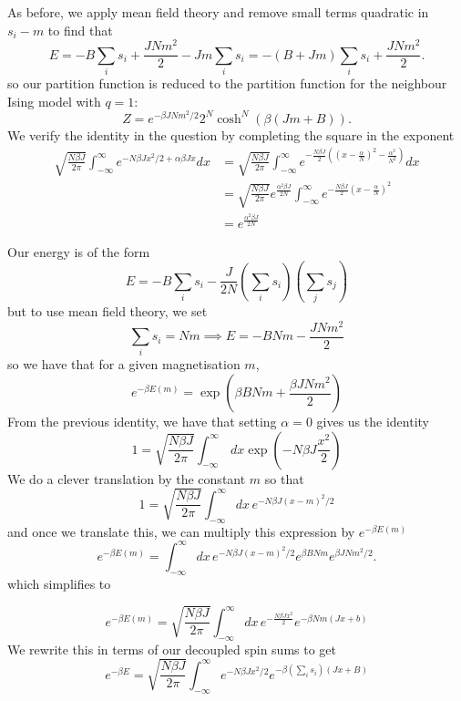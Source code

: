 \documentclass[11pt, oneside]{article}   	%
\begin{document}
As before, we apply mean field theory and remove small terms quadratic in $s_i - m$ to find that 
\[ 
	E = - B \sum_i s_i +  \frac{JNm^2}{2} - J m \sum_i s_i  = - (B + Jm ) \sum_i s_i + \frac{JNm^2}{2}. 
\] 
so our partition function is reduced to the partition function for the neighbour Ising model with $q = 1$: 
\[
	Z =  e^{ - \beta J N m^2 / 2}2^N \cosh^N(\beta(J m + B)). 
\]
We verify the identity in the question by completing the square in the exponent 
\begin{align*}
	\sqrt{\frac{N \beta J }{2 \pi}} \int_{ -\infty}^{\infty} e^{ - N \beta J x^2 / 2 + \alpha \beta J x } dx&= \sqrt{\frac{N \beta J }{2 \pi}} \int_{- \infty}^{\infty} e^{ - \frac{N \beta J }{2} ((x - \frac{\alpha}{N})^2 - \frac{\alpha^2}{N^2})}dx \\ 
		&= \sqrt{\frac{N \beta J }{2 \pi}} e^{\frac{\alpha^2 \beta J }{2 N }} \int_{ - \infty}^{\infty} e^{ -\frac{N \beta J }{2} (x - \frac{\alpha}{N})^2} \\
		&= e^{\frac{\alpha^2 \beta J }{2 N }}
\end{align*}



Our energy is of the form 
\[
	E = - B\sum_i s_i - \frac{J}{2N}\left( \sum_i s_i \right) \left( \sum_j s_j \right)  
\]
but to use mean field theory, we set 
\[
	\sum_i s_i = Nm \implies E = - BNm - \frac{JNm^2}{2} 
\]
so we have that for a given magnetisation $m$, 
\[
	e^{ - \beta E(m) } = \exp(\beta B Nm + \frac{\beta JNm^2}{2}) 
\]
From the previous identity, we have that setting $\alpha = 0$ gives us the identity 
\[
	1 = \sqrt{\frac{N \beta J}{2 \pi}} \int_{ - \infty}^{\infty} \, dx \exp( - N \beta J \frac{x^2}{2}) 
\]
We do a clever translation by the constant $m$ so that 
\[
	1 = \sqrt{\frac{N\beta J}{2 \pi}} \int_{-\infty}^\infty dx \, e^{ - N \beta J (x - m)^2 / 2}
\]
and once we translate this, we can multiply this expression by $e^{ - \beta E(m)}$
\[
	e^{ - \beta E(m)} = \int_{ - \infty}^\infty dx \, e^{ - N \beta J (x - m)^2  / 2}e^{\beta B N m}e^{\beta J N m^2 / 2}.
\]
which simplifies to 


\[
e^{ - \beta E(m)} = \sqrt{\frac{N \beta J}{2 \pi}} \int_{ - \infty}^{\infty} dx \, e^{ - \frac{N \beta J x^2}{2}}e^{ - \beta Nm(J x + b)}  
\]
We rewrite this in terms of our decoupled spin sums to get 
\[
e^{ - \beta E} = \sqrt{\frac{N \beta J }{2 \pi}} \int_{ - \infty}^\infty e^{ - N \beta J x^2 / 2}e^{ - \beta \left(  \sum_i s_i \right) (Jx + B)}
\]
\end{document}
